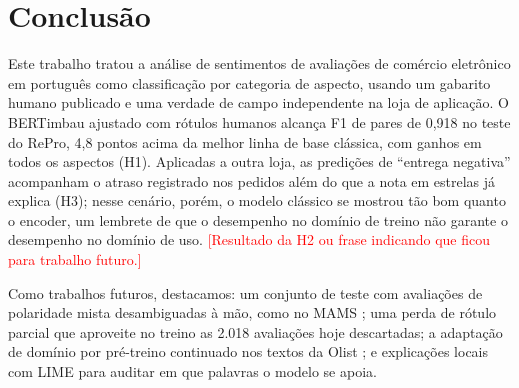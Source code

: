 \documentclass[12pt,a4paper]{article}
\newcommand{\pendente}[1]{\textcolor{red}{[#1]}}
\begin{document}
\section{Conclusão}

Este trabalho tratou a análise de sentimentos de avaliações de comércio eletrônico em português como classificação por categoria de aspecto, usando um gabarito humano publicado e uma verdade de campo independente na loja de aplicação. O BERTimbau ajustado com rótulos humanos alcança F1 de pares de 0,918 no teste do RePro, 4,8 pontos acima da melhor linha de base clássica, com ganhos em todos os aspectos (H1). Aplicadas a outra loja, as predições de ``entrega negativa'' acompanham o atraso registrado nos pedidos além do que a nota em estrelas já explica (H3); nesse cenário, porém, o modelo clássico se mostrou tão bom quanto o encoder, um lembrete de que o desempenho no domínio de treino não garante o desempenho no domínio de uso. \pendente{Resultado da H2 ou frase indicando que ficou para trabalho futuro.}

Como trabalhos futuros, destacamos: um conjunto de teste com avaliações de polaridade mista desambiguadas à mão, como no MAMS \citep{jiang2019mams}; uma perda de rótulo parcial que aproveite no treino as 2.018 avaliações hoje descartadas; a adaptação de domínio por pré-treino continuado nos textos da Olist \citep{gururangan2020dont}; e explicações locais com LIME \citep{ribeiro2016lime} para auditar em que palavras o modelo se apoia.



\end{document}
